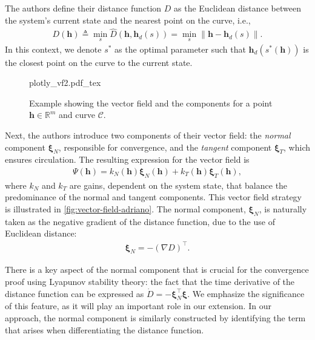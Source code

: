 The authors define their distance function $D$ as the Euclidean distance between the system's current state and the nearest point on the curve, i.e., 
\begin{align}
    D(\mathbf{h}) \triangleq \min_{s}\widehat{D}(\mathbf{h}, \mathbf{h}_d(s))=\min_{s}\|\mathbf{h}- \mathbf{h}_d(s)\|. \label{eq:adriano-EC-distance}   
\end{align}
In this context, we denote $s^*$ as the optimal parameter such that $\mathbf{h}_d(s^*(\mathbf{h}))$ is the closest point on the curve to the current state.
\begin{figure}
    \centering
    \def\svgwidth{.8\linewidth}
    {plotly_vf2.pdf_tex}
    \caption{Example showing the vector field and the components for a point $\mathbf{h}\in \mathbb{R}^m$ and curve $\mathcal{C}$.}
    \label{fig:vector-field-adriano}
\end{figure}

Next, the authors introduce two components of their vector field: the \emph{normal} component $\boldsymbol{\xi}_{N}$, responsible for convergence, and the \emph{tangent} component $\boldsymbol{\xi}_{T}$, which ensures circulation. The resulting expression for the vector field is 
\begin{align}
    \Psi(\mathbf{h}) = k_N(\mathbf{h})\boldsymbol{\xi}_{N}(\mathbf{h}) + k_T(\mathbf{h})\boldsymbol{\xi}_{T}(\mathbf{h}), \label{eq:adriano-vector-field-expression}    
\end{align}
where $k_N$ and $k_T$ are gains, dependent on the system state, that balance the predominance of the normal and tangent components. This vector field strategy is illustrated in \autoref{fig:vector-field-adriano}. The normal component, $\boldsymbol{\xi}_{N}$, is naturally taken as the negative gradient of the distance function, due to the use of Euclidean distance:
\begin{align}
    \boldsymbol{\xi}_{N} = -(\nabla D)^\top.
\end{align}

There is a key aspect of the normal component that is crucial for the convergence proof using Lyapunov stability theory: the fact that the time derivative of the distance function can be expressed as $\dot{D}=-\boldsymbol{\xi}_{N}^{\top}{\boldsymbol{\xi}}$. We emphasize the significance of this feature, as it will play an important role in our extension. In our approach, the normal component is similarly constructed by identifying the term that arises when differentiating the distance function.

